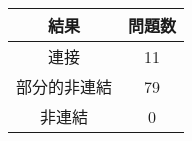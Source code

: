 \begin{tabular}{|c|c|} \hline
  結果 & 問題数 \\ \hline
  連接 & 11 \\ \hline
  部分的非連結 & 79 \\ \hline
  非連結 & 0 \\ \hline
\end{tabular}